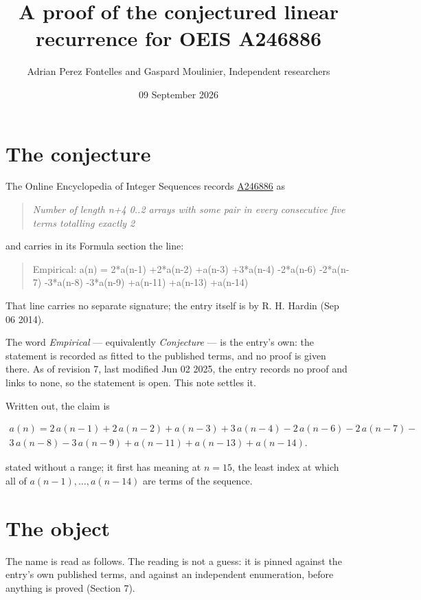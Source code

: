 \documentclass[11pt]{article}
\title{A proof of the conjectured linear recurrence for OEIS A246886}
\author{Adrian Perez Fontelles and Gaspard Moulinier, Independent researchers}
\date{09 September 2026}
\theoremstyle{definition}
\begin{document}
\maketitle
\section{The conjecture}

The Online Encyclopedia of Integer Sequences records \href{https://oeis.org/A246886}{A246886} as

\begin{quote}\itshape Number of length n+4 0..2 arrays with some pair in every consecutive five terms totalling exactly 2\end{quote}

and carries in its Formula section the line:

\begin{quote}\ttfamily Empirical: a(n) = 2*a(n-1) +2*a(n-2) +a(n-3) +3*a(n-4) -2*a(n-6) -2*a(n-7) -3*a(n-8) -3*a(n-9) +a(n-11) +a(n-13) +a(n-14)\end{quote}

That line carries no separate signature; the entry itself is by R. H. Hardin (Sep 06 2014).

The word {\itshape Empirical} --- equivalently {\itshape Conjecture} --- is the entry's own: the statement is recorded as fitted to the published terms, and no proof is given there. As of revision 7, last modified Jun 02 2025, the entry records no proof and links to none, so the statement is open. This note settles it.

Written out, the claim is

\begin{multline*} a(n) = 2\,a(n-1) + 2\,a(n-2) + a(n-3) + 3\,a(n-4) - 2\,a(n-6) - 2\,a(n-7) - \\ 3\,a(n-8) - 3\,a(n-9) + a(n-11) + a(n-13) + a(n-14). \end{multline*}

stated without a range; it first has meaning at $n = 15$, the least index at which all of $a(n-1),\dots,a(n-14)$ are terms of the sequence.

\section{The object}

The name is read as follows. The reading is not a guess: it is pinned against the entry's own published terms, and against an independent enumeration, before anything is proved (Section 7).
\end{document}
